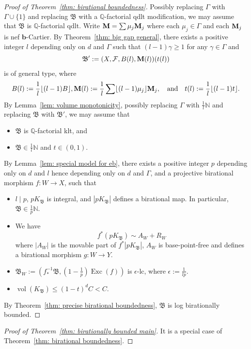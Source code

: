 \documentclass[11pt,reqno]{amsart}
\numberwithin{equation}{section}
\newcommand{\bb}{\bm{b}}
\newcommand{\Mm}{{\bf{M}}}
\newcommand{\vol}{\operatorname{vol}}
\newcommand{\Exc}{\operatorname{Exc}}
\newcommand{\Bb}{{\mathfrak{B}}}
\newcommand{\Ff}{\mathcal{F}}
\newcommand{\Ii}{\Gamma}
\theoremstyle{definition}
\begin{document}
\begin{proof}[Proof of Theorem~\ref{thm: birational boundedness}] Possibly replacing $\Ii$ with $\Ii\cup\{1\}$ and replacing $\Bb$ with a $\mathbb Q$-factorial qdlt modification, we may assume that $\Bb$ is $\mathbb Q$-factorial qdlt. Write $\Mm=\sum\mu_j\Mm_j$ where each $\mu_j\in\Ii$ and each $\Mm_j$ is nef $\bb$-Cartier. By Theorem~\ref{thm: big gap general}, there exists a positive integer $l$ depending only on $d$ and $\Ii$ such that $(l-1)\gamma\geq 1$ for any $\gamma\in\Ii$ and
$$\Bb':=(X,\Ff,B(l),\Mm(l))(t(l))$$
is of general type, where 
$$B(l):=\frac{1}{l}\lfloor (l-1)B\rfloor,\Mm(l):=\frac{1}{l}\sum \lfloor (l-1)\mu_j\rfloor\Mm_j,\quad \text{and}\quad t(l):=\frac{1}{l}\lfloor (l-1)t\rfloor.$$
By Lemma~\ref{lem: volume monotonicity}, possibly replacing $\Ii$ with $\frac{1}{l}\mathbb N$ and replacing $\Bb$ with $\Bb'$, we may assume that
\begin{itemize}
    \item $\Bb$ is $\mathbb Q$-factorial klt, and
    \item $\Bb\in\frac{1}{l}\mathbb N$ and $t\in (0,1)$.
\end{itemize}
By Lemma~\ref{lem: special model for eb}, there exists a positive integer $p$ depending only on $d$ and $l$ hence depending only on $d$ and $\Ii$, and a projective birational morphism $f: W\rightarrow X$, such that
\begin{itemize}
    \item $l\mid p$, $pK_{\Bb}$ is integral, and $|pK_{\Bb}|$ defines a birational map. In particular, $\Bb\in\frac{1}{p}\mathbb N$.
    \item We have
        $$f^*(pK_{\Bb})\sim A_W+R_W$$
    where $|A_W|$ is the movable part of $f^*|pK_{\Bb}|$, $A_W$ is base-point-free and defines a birational morphism $g: W\rightarrow Y$.
\item $\Bb_W:=\left(f^{-1}_*\Bb,\left(1-\frac{1}{p}\right)\Exc(f)\right)$ is $\epsilon$-lc, where $\epsilon:=\frac{1}{lp}$.
\item $\vol(K_{\Bb})\leq (1-t)^dC<C$.
\end{itemize}
By Theorem~\ref{thm: precise birational boundedness}, $\Bb$ is log birationally bounded.
\end{proof}

\begin{proof}[Proof of Theorem~\ref{thm: birationally bounded main}] It is a special case of Theorem~\ref{thm: birational boundedness}.
\end{proof}
\end{document}
